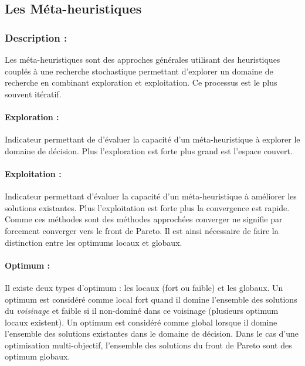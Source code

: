 \subsection{Les Méta-heuristiques} %
\label{sub:les_meta_heuristiques}
\subsubsection{Description :} %
\label{ssub:description}
Les méta-heuristiques sont des approches générales utilisant des heuristiques
couplés à une recherche stochastique permettant d’explorer un domaine de recherche
en combinant exploration et exploitation. Ce processus est le plus souvent
itératif.

\paragraph{Exploration :} %
\label{par:exploration}
Indicateur permettant de d’évaluer la capacité d’un méta-heuristique à explorer
le domaine de décision. Plus l’exploration est forte plus grand est l’espace
couvert.

\paragraph{Exploitation :} %
\label{par:exploitation}
Indicateur permettant d’évaluer la capacité d’un méta-heuristique à améliorer les
solutions existantes. Plus l’exploitation est forte plus la convergence est rapide.
Comme ces méthodes sont des méthodes approchées converger ne signifie par forcement
converger vers le front de Pareto. Il est ainsi nécessaire de faire la distinction
entre les optimums locaux et globaux.

\paragraph{Optimum :} %
\label{par:optimum}
Il existe deux types d’optimum : les locaux (fort ou faible) et les globaux.
Un optimum est considéré comme local fort quand il domine l’ensemble des solutions
du \emph{voisinage} et faible si il non-dominé dans ce voisinage (plusieurs
optimum locaux existent). Un optimum est considéré comme global lorsque il domine
l’ensemble des solutions existantes dans le domaine de décision. Dans le cas d’une
optimisation multi-objectif, l’ensemble des solutions du front de Pareto sont des
optimum globaux.

